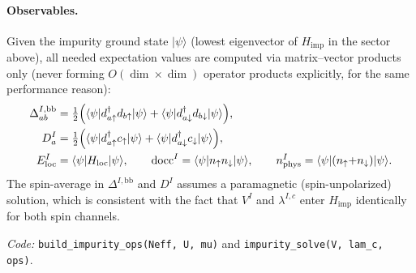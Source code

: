 \documentclass[11pt]{article}
\newcommand{\Himp}{H_{\mathrm{imp}}}
\newcommand{\Hloc}{H_{\mathrm{loc}}}
\begin{document}
\paragraph{Observables.} Given the impurity ground state $|\psi\rangle$
(lowest eigenvector of $\Himp$ in the sector above), all needed expectation values are computed
via matrix--vector products only (never forming $O(\dim\times\dim)$ operator
products explicitly, for the same performance reason):
\begin{align}
  \Delta^{I,\mathrm{bb}}_{ab} &= \tfrac12\Bigl(\langle\psi|d^{\dagger}_{a\uparrow}d_{b\uparrow}|\psi\rangle
     + \langle\psi|d^{\dagger}_{a\downarrow}d_{b\downarrow}|\psi\rangle\Bigr), \\
  D^{I}_{a} &= \tfrac12\Bigl(\langle\psi|d^{\dagger}_{a\uparrow}c_{\uparrow}|\psi\rangle
     + \langle\psi|d^{\dagger}_{a\downarrow}c_{\downarrow}|\psi\rangle\Bigr), \\
  E^{I}_{\mathrm{loc}} &= \langle\psi|\Hloc|\psi\rangle, \qquad
  \mathrm{docc}^{I} = \langle\psi|n_\uparrow n_\downarrow|\psi\rangle, \qquad
  n^{I}_{\mathrm{phys}} = \langle\psi|(n_\uparrow{+}n_\downarrow)|\psi\rangle .
\end{align}
The spin-average in $\Delta^{I,\mathrm{bb}}$ and $D^I$ assumes a paramagnetic
(spin-unpolarized) solution, which is consistent with the fact that $V^I$ and
$\lambda^{I,c}$ enter $\Himp$ identically for both spin channels.

\emph{Code:} \texttt{build\_impurity\_ops(Neff, U, mu)} and
\texttt{impurity\_solve(V, lam\_c, ops)}.
\end{document}
